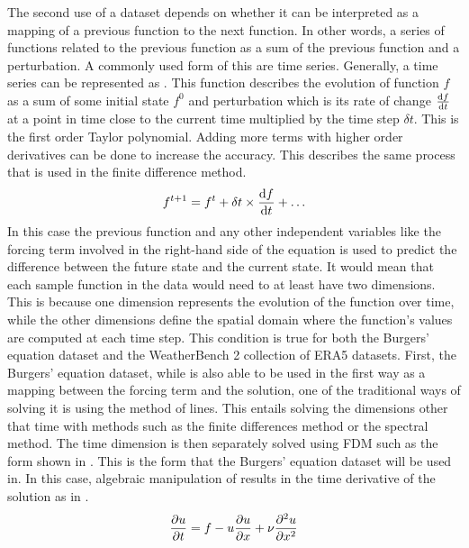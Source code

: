 The second use of a dataset depends on whether it can be interpreted as a mapping of a previous function to the next function. In other words, a series of functions related to the previous function as a sum of the previous function and a perturbation. A commonly used form of this are time series. Generally, a time series can be represented as . This function describes the evolution of function \(f\) as a sum of some initial state \(f^0\) and perturbation which is its rate of change \(\dv{f}{t}\) at a point in time close to the current time multiplied by the time step \(\delta t\). This is the first order Taylor polynomial. Adding more terms with higher order derivatives can be done to increase the accuracy. This describes the same process that is used in the finite difference method.
\begin{equation}
  f^{t+1} = f^{t} + \delta t \times \dv{f}{t} + \dots \label{eq:time_step_function}
\end{equation}
In this case the previous function and any other independent variables like the forcing term involved in the right-hand side of the equation is used to predict the difference between the future state and the current state. It would mean that each sample function in the data would need to at least have two dimensions. This is because one dimension represents the evolution of the function over time, while the other dimensions define the spatial domain where the function's values are computed at each time step. This condition is true for both the Burgers' equation dataset and the WeatherBench 2 collection of ERA5 datasets. First, the Burgers' equation dataset, while is also able to be used in the first way as a mapping between the forcing term and the solution, one of the traditional ways of solving it is using the method of lines. This entails solving the dimensions other that time with methods such as the finite differences method or the spectral method. The time dimension is then separately solved using FDM such as the form shown in  \autocite{schiesserNumericalMethodLines2012,sadikuSimpleIntroductionMethod2000}. This is the form that the Burgers' equation dataset will be used in. In this case, algebraic manipulation of  results in the time derivative of the solution as in .
\begin{align}
  \pdv{u}{t} = f - u\pdv{u}{x} + \nu\pdv[2]{u}{x} \label{eq:forced_viscous_burgers_time_derivative}
\end{align}
